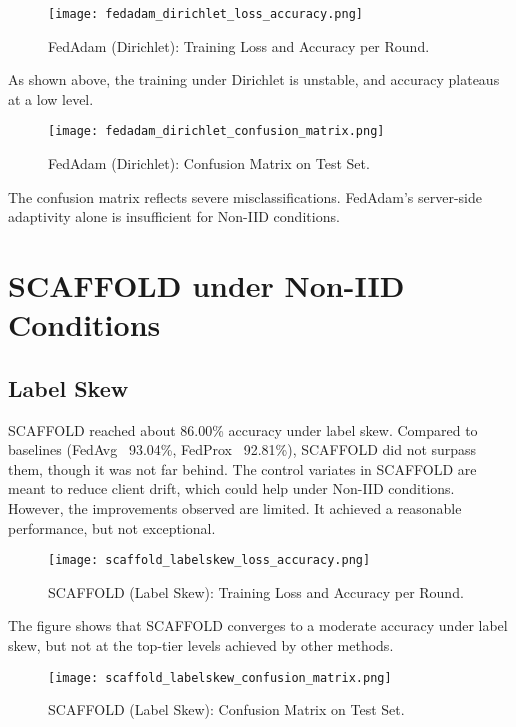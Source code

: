 \documentclass[12pt,a4paper]{report}
\begin{document}
\begin{figure}[H]
	\centering
	\texttt{[image: fedadam\_dirichlet\_loss\_accuracy.png]}
	\caption{FedAdam (Dirichlet): Training Loss and Accuracy per Round.}
\end{figure}

As shown above, the training under Dirichlet is unstable, and accuracy plateaus at a low level.

\begin{figure}[H]
	\centering
	\texttt{[image: fedadam\_dirichlet\_confusion\_matrix.png]}
	\caption{FedAdam (Dirichlet): Confusion Matrix on Test Set.}
\end{figure}

The confusion matrix reflects severe misclassifications. FedAdam’s server-side adaptivity alone is insufficient for Non-IID conditions.

\section{SCAFFOLD under Non-IID Conditions}

\subsection{Label Skew}
SCAFFOLD reached about 86.00\% accuracy under label skew. Compared to baselines (FedAvg ~93.04\%, FedProx ~92.81\%), SCAFFOLD did not surpass them, though it was not far behind. The control variates in SCAFFOLD are meant to reduce client drift, which could help under Non-IID conditions. However, the improvements observed are limited. It achieved a reasonable performance, but not exceptional.

\begin{figure}[H]
	\centering
	\texttt{[image: scaffold\_labelskew\_loss\_accuracy.png]}
	\caption{SCAFFOLD (Label Skew): Training Loss and Accuracy per Round.}
\end{figure}

The figure shows that SCAFFOLD converges to a moderate accuracy under label skew, but not at the top-tier levels achieved by other methods.

\begin{figure}[H]
	\centering
	\texttt{[image: scaffold\_labelskew\_confusion\_matrix.png]}
	\caption{SCAFFOLD (Label Skew): Confusion Matrix on Test Set.}
\end{figure}
\end{document}
